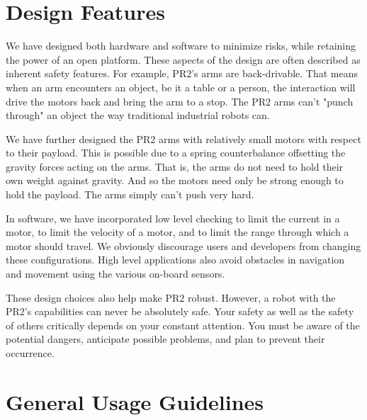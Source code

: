 \section{Design Features}

We have designed both hardware and software to minimize risks, while retaining the power of an open platform.  These aspects of the design are often described as inherent safety features.  For example, PR2's arms are back-drivable.  That means when an arm encounters an object, be it a table or a person, the interaction will drive the motors back and bring the arm to a stop.  The PR2 arms can't "punch through" an object the way traditional industrial robots can.

We have further designed the PR2 arms with relatively small motors with respect to their payload.  This is possible due to a spring counterbalance offsetting the gravity forces acting on the arms.  That is, the arms do not need to hold their own weight against gravity.  And so the motors need only be strong enough to hold the payload.  The arms simply can't push very hard.

In software, we have incorporated low level checking to limit the current in a motor, to limit the velocity of a motor, and to limit the range through which a motor should travel.  We obviously discourage users and developers from changing these configurations.  High level applications also avoid obstacles in navigation and movement using the various on-board sensors.

These design choices also help make PR2 robust.  However, a robot with the PR2's capabilities can never be absolutely safe. Your safety as well as the safety of others critically depends on your constant attention. You must be aware of the potential dangers, anticipate possible problems, and plan to prevent their occurrence.

\section{General Usage Guidelines}

